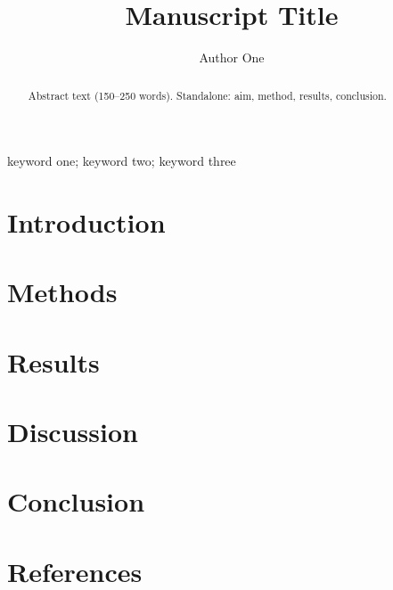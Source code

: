 \documentclass[review]{elsarticle}
\begin{document}
\begin{frontmatter}
\title{Manuscript Title}

\author{Author One}
\address{Affiliation, City, Country}

\begin{abstract}
Abstract text (150--250 words). Standalone: aim, method, results, conclusion.
\end{abstract}

\begin{keyword}
keyword one; keyword two; keyword three
\end{keyword}
\end{frontmatter}

\section{Introduction}

\section{Methods}

\section{Results}

\section{Discussion}

\section{Conclusion}

\section*{References}



\end{document}
